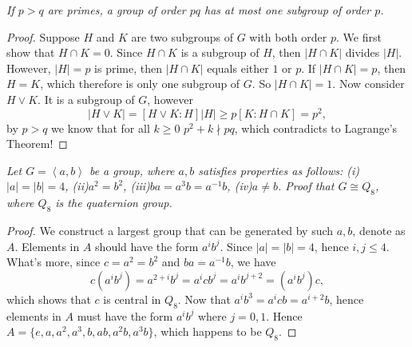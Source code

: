 \begin{problem}\em
If $p>q$ are primes, a group of order $pq$ has at most one subgroup of order $p$. 
\end{problem}
\begin{proof}
Suppose $H$ and $K$ are two subgroups of $G$ with both order $p$. We first show that $H\cap K=0$. Since $H\cap K$ is a subgroup of $H$, then $|H\cap K|$ divides $|H|$. However, $|H|=p$ is prime, then $|H\cap K|$ equals either $1$ or $p$. If $|H\cap K|=p$, then $H=K$, which therefore is only one subgroup of $G$. So $|H\cap K|=1$. Now consider $H\vee K$. It is a subgroup of $G$, however
$$
\left| H\lor K \right|=\left[ H\lor K:H \right] \left| H \right|\ge p\left[ K:H\cap K \right] =p^2,
$$
by $p>q$ we know that for all $k\ge 0$ $p^2+k\nmid pq$, which contradicts to Lagrange's Theorem!
\end{proof}
\begin{problem}\em
Let $G=\left<a,b\right>$ be a group, where $a,b$ satisfies properties as follows: (i)$|a|=|b|=4$, (ii)$a^2=b^2$, (iii)$ba=a^3b=a^{-1}b$, (iv)$a\ne b$. Proof that $G\cong Q_8$, where $Q_8$ is the quaternion group.
\end{problem}
\begin{proof}
We construct a largest group that can be generated by such $a,b$, denote as $A$. Elements in $A$ should have the form $a^ib^j$. Since $|a|=|b|=4$, hence $i,j\le 4$. What's more, since $c=a^2=b^2$ and $ba=a^{-1}b$, we have 
$$
c(a^ib^j)=a^{2+i}b^j=a^icb^j=a^ib^{j+2}=(a^ib^j)c,
$$
which shows that $c$ is central in $Q_8$. Now that $a^ib^3=a^icb=a^{i+2}b$, hence elements in $A$ must have the form $a^ib^j$ where $j=0,1$. Hence $A=\{e,a,a^2,a^3,b,ab,a^2b,a^3b\}$, which happens to be $Q_8$.
\end{proof}
